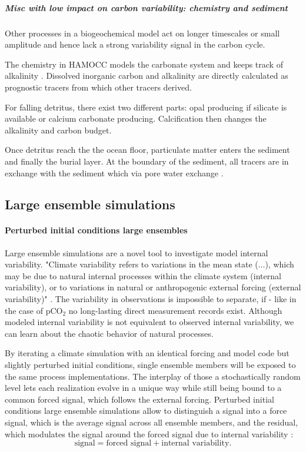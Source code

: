 \documentclass[12pt]{article}
\begin{document}
\subparagraph{Misc with low impact on carbon variability: chemistry and sediment}
Other processes in a biogeochemical model act on longer timescales or small amplitude and hence lack a strong variability signal in the carbon cycle. 

The chemistry in HAMOCC models the carbonate system and keeps track of alkalinity \citep{Maier-Reimer1993}. Dissolved inorganic carbon and alkalinity are directly calculated as prognostic tracers from which other tracers derived.%

For falling detritus, there exist two different parts: opal producing if silicate is available or calcium carbonate producing. Calcification then changes the alkalinity and carbon budget.

Once detritus reach the the ocean floor, particulate matter enters the sediment and finally the burial layer. At the boundary of the sediment, all tracers are in exchange with the sediment which via pore water exchange \citep{Heinze1999}.










\subsection{Large ensemble simulations}
\label{sec:PICLE}
\paragraph{Perturbed initial conditions large ensembles}
Large ensemble simulations are a novel tool to investigate model internal variability. "Climate variability refers to variations in the mean state (...), which may be due to natural internal processes within the climate system (internal variability), or to variations in natural or anthropogenic external forcing (external variability)" \citep{IPCC}. The variability in observations is impossible to separate, if - like in the case of pCO$_2$ no long-lasting direct measurement records exist.
Although modeled internal variability is not equivalent to observed internal variability, we can learn about the chaotic behavior of natural processes.

By iterating a climate simulation with an identical forcing and model code but slightly perturbed initial conditions, single ensemble members will be exposed to the same process implementations. The interplay of those a stochastically random level lets each realization evolve in a unique way while still being bound to a common forced signal, which follows the external forcing. Perturbed initial conditions large ensemble simulations allow to distinguish a signal into a force signal, which is the average signal across all ensemble members, and the residual, which modulates the signal around the forced signal due to internal variability \citep{ilyinaletter2016}: 
\[ \text{signal}=\text{forced signal}+\text{internal variability}.\]
\end{document}
